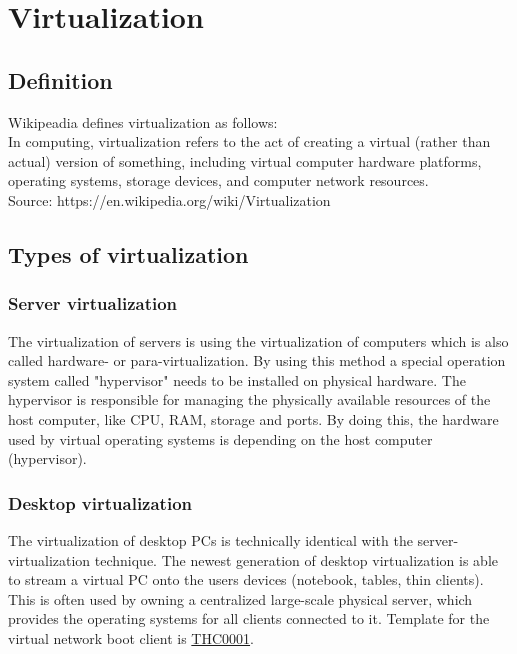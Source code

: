 \newpage

\section{Virtualization}

\subsection{Definition}

Wikipeadia defines virtualization as follows:
\\In computing, virtualization refers to the act of creating a virtual (rather than actual) version of something, including virtual computer hardware platforms, operating systems, storage devices, and computer network resources. \\
Source: https://en.wikipedia.org/wiki/Virtualization

\subsection{Types of virtualization}

\subsubsection{Server virtualization}

The virtualization of servers is using the virtualization of computers which is also called hardware- or para-virtualization. By using this method a special operation system called "hypervisor" needs to be installed on physical hardware. The hypervisor is responsible for managing the physically available resources of the host computer, like CPU, RAM, storage and ports. By doing this, the hardware used by virtual operating systems is depending on the host computer (hypervisor).

\subsubsection{Desktop virtualization}

The virtualization of desktop PCs is technically identical with the server-virtualization technique. The newest generation of desktop virtualization is able to stream a virtual PC onto the users devices (notebook, tables, thin clients). This is often used by owning a centralized large-scale physical server, which provides the operating systems for all clients connected to it.
\newline
\newline
Template for the virtual network boot client is \underline{THC0001}.

